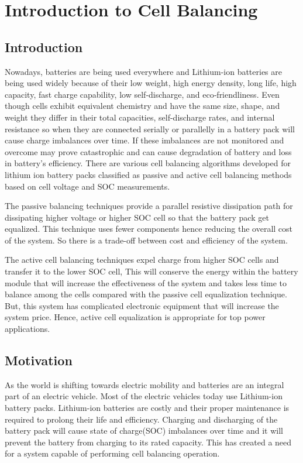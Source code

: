 \chapter{Introduction to Cell Balancing}

\section[Introduction]{\textbf{Introduction}}
Nowadays, batteries are being used everywhere and Lithium-ion batteries are being used widely because of their low weight, high energy density, long life, high capacity, fast charge capability, low self‐discharge, and eco‐friendliness\cite{li-ion-overview}. Even though cells exhibit equivalent chemistry and have the same size, shape, and weight they differ in their total capacities, self-discharge rates, and internal resistance so when they are connected serially or parallelly in a battery pack will cause charge imbalances over time. If these imbalances are not monitored and overcome may prove catastrophic and can cause degradation of battery and loss in battery's efficiency. There are various cell balancing algorithms developed for lithium ion battery packs\cite{Changhao} classified as passive and active cell balancing methods based on cell voltage and SOC measurements\cite{6043010}.

The passive balancing techniques provide a parallel resistive dissipation path for dissipating higher voltage or higher SOC cell so that the battery pack get equalized. This technique uses fewer components hence reducing the overall cost of the system. So there is a trade-off between cost and efficiency of the system.

The active cell balancing techniques expel charge from higher SOC cells and transfer it to the lower SOC cell, This will conserve the energy within the battery module that will increase the effectiveness of the system and takes less time to balance among the cells compared with the passive cell equalization technique. But, this system has complicated electronic equipment that will increase the system price. Hence, active cell equalization is appropriate for top power applications.


\section[Motivation]{\textbf{Motivation}}

As the world is shifting towards electric mobility and batteries are an integral part of an electric vehicle. Most of the electric vehicles today use Lithium-ion battery packs. Lithium-ion batteries are costly and their proper maintenance is required to prolong their life and efficiency. Charging and discharging of the battery pack will cause state of charge(SOC) imbalances over time and it will prevent the battery from charging to its rated capacity. This has created a need for a system capable of performing cell balancing operation.

